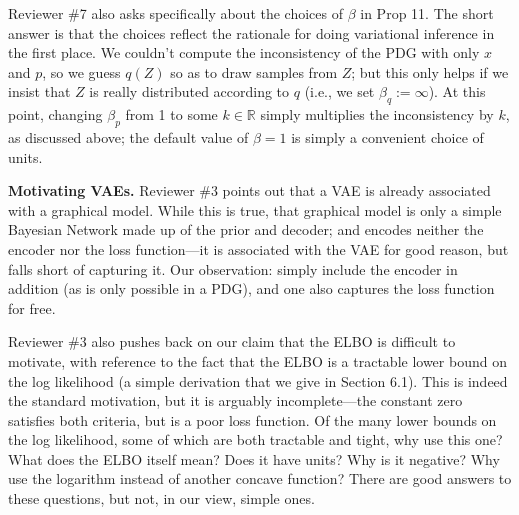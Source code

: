 \documentclass{article}
\theoremstyle{plain}
\theoremstyle{definition}
\begin{document}
Reviewer \#7 also asks specifically about the choices of $\beta$ in Prop 11. The short answer is that the choices reflect the rationale for doing variational inference in the first place.  We couldn’t compute the inconsistency of the PDG with only $x$ and $p$, so we guess $q(Z)$ so as to draw samples from $Z$;  but this only helps if we insist that $Z$ is really distributed according to $q$ (i.e., we set $\beta_q := \infty$). At this point, changing $\beta_p$ from 1 to some $k \in \mathbb R$ simply multiplies the inconsistency by $k$, as discussed above; the default value of $\beta=1$ is simply a convenient choice of units.


\textbf{Motivating VAEs.}
Reviewer \#3 points out that a VAE is already associated with a graphical model.
While this is true, that graphical model is only a simple Bayesian Network made up of the prior and decoder; and encodes neither the encoder nor the loss function---it is associated with the VAE for good reason, but falls short of capturing it.  Our observation: simply include the encoder in addition (as is only possible in a PDG), and one also captures the loss function for free.

Reviewer \#3 also pushes back on our claim that the ELBO is difficult to motivate, with reference to the fact that the ELBO is a tractable lower bound on the log likelihood (a simple derivation that we give in Section 6.1).   This is indeed the standard motivation, but it is arguably incomplete---the constant zero satisfies both criteria, but is a poor loss function. Of the many lower bounds on the log likelihood, some of which are both tractable and tight, why use this one? What does the ELBO itself mean? Does it have units? Why is it negative?  Why use the logarithm instead of another concave function?  There are good answers to these questions, but not, in our view, simple ones.
\end{document}
